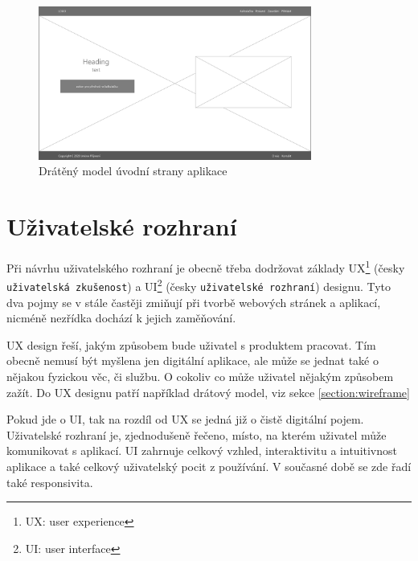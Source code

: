 \begin{figure}
    \centering
    \includegraphics[width=0.8\textwidth]{obrazky-figures/wireframe-homepage.pdf}
    \caption{Drátěný model úvodní strany aplikace}
    \label{fig:wireframe-homepage}
\end{figure}



\section{Uživatelské rozhraní}
Při návrhu uživatelského rozhraní je obecně třeba dodržovat základy UX\footnote{UX: user experience} (česky \texttt{uživatelská zkušenost}) a UI\footnote{UI: user interface} (česky \texttt{uživatelské rozhraní}) designu. Tyto dva pojmy se v stále častěji zmiňují při tvorbě webových stránek a aplikací, nicméně nezřídka dochází k jejich zaměňování. 
\par UX design řeší, jakým způsobem bude uživatel s produktem pracovat. Tím obecně nemusí být myšlena jen digitální aplikace, ale může se jednat také o nějakou fyzickou věc, či službu. O cokoliv co může uživatel nějakým způsobem zažít. Do UX designu patří například drátový model, viz sekce \ref{section:wireframe}
\par Pokud jde o UI, tak na rozdíl od UX se jedná již o čistě digitální pojem. Uživatelské rozhraní je, zjednodušeně řečeno, místo, na kterém uživatel může komunikovat s aplikací. UI zahrnuje celkový vzhled, interaktivitu a intuitivnost aplikace a také celkový uživatelský pocit z používání. V současné době se zde řadí také responsivita.

